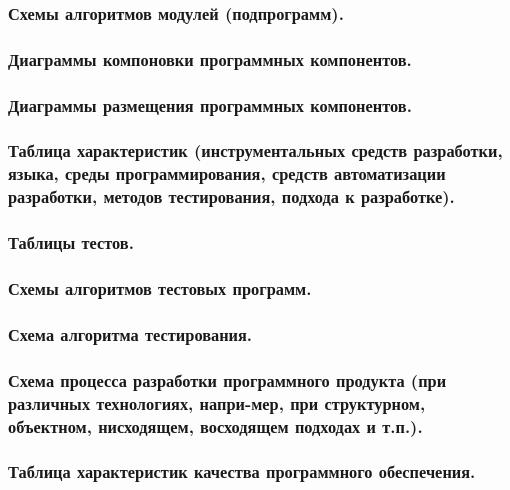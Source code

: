 \documentclass[utf8x, 12pt, oneside, a4paper]{article}
\begin{document}
	\subsubsection{\textbf{Схемы алгоритмов модулей (подпрограмм).}}
	
	\subsubsection{\textbf{Диаграммы компоновки программных компонентов.}}

	\subsubsection{\textbf{Диаграммы размещения программных компонентов.}}

	\subsubsection{\textbf{Таблица характеристик (инструментальных средств разработки, языка, среды программирования, средств автоматизации разработки, методов тестирования, подхода к разработке).}}

	\subsubsection{\textbf{Таблицы тестов.}}

	\subsubsection{\textbf{Схемы алгоритмов тестовых программ.}}

	\subsubsection{\textbf{Схема алгоритма тестирования.}}

	\subsubsection{\textbf{Схема процесса разработки программного продукта (при различных технологиях, напри-мер, при структурном, объектном, нисходящем, восходящем подходах и т.п.).}}

	\subsubsection{\textbf{Таблица характеристик качества программного обеспечения.}}
\end{document}
